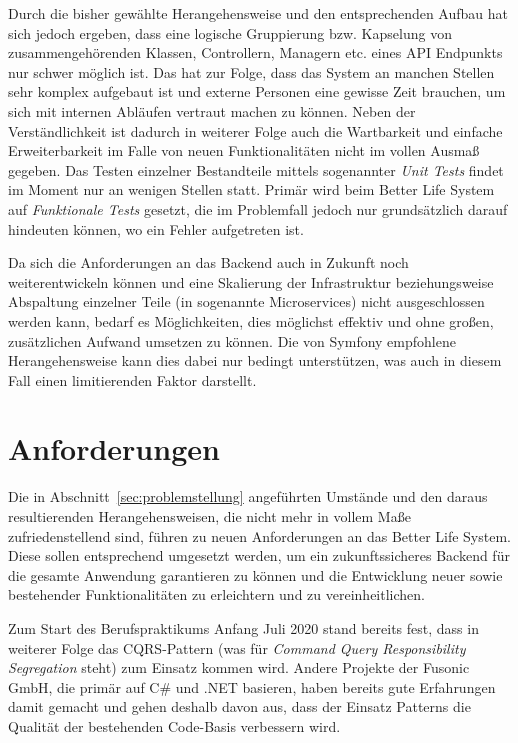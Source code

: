\documentclass[a4paper,12pt,twoside]{scrreprt}
\begin{document}
Durch die bisher gewählte Herangehensweise und den entsprechenden Aufbau hat sich jedoch ergeben, dass eine logische Gruppierung bzw. Kapselung von zusammengehörenden Klassen, Controllern, Managern etc. eines API Endpunkts nur schwer möglich ist. Das hat zur Folge, dass das System an manchen Stellen sehr komplex aufgebaut ist und externe Personen eine gewisse Zeit brauchen, um sich mit internen Abläufen vertraut machen zu können. Neben der Verständlichkeit ist dadurch in weiterer Folge auch die Wartbarkeit und einfache Erweiterbarkeit im Falle von neuen Funktionalitäten nicht im vollen Ausmaß gegeben. Das Testen einzelner Bestandteile mittels sogenannter \textit{Unit Tests} findet im Moment nur an wenigen Stellen statt. Primär wird beim Better Life System auf \textit{Funktionale Tests} gesetzt, die im Problemfall jedoch nur grundsätzlich darauf hindeuten können, wo ein Fehler aufgetreten ist.

Da sich die Anforderungen an das Backend auch in Zukunft noch weiterentwickeln können und eine Skalierung der Infrastruktur beziehungsweise Abspaltung einzelner Teile (in sogenannte Microservices) nicht ausgeschlossen werden kann, bedarf es Möglichkeiten, dies möglichst effektiv und ohne großen, zusätzlichen Aufwand umsetzen zu können. Die von Symfony empfohlene Herangehensweise kann dies dabei nur bedingt unterstützen, was auch in diesem Fall einen limitierenden Faktor darstellt.

\section{Anforderungen}
\label{sec:anforderungen}
Die in Abschnitt~\ref{sec:problemstellung} angeführten Umstände und den daraus resultierenden Herangehensweisen, die nicht mehr in vollem Maße zufriedenstellend sind, führen zu neuen Anforderungen an das Better Life System. Diese sollen entsprechend umgesetzt werden, um ein zukunftssicheres Backend für die gesamte Anwendung garantieren zu können und die Entwicklung neuer sowie bestehender Funktionalitäten zu erleichtern und zu vereinheitlichen.

\medskip

Zum Start des Berufspraktikums Anfang Juli 2020 stand bereits fest, dass in weiterer Folge das CQRS-Pattern (was für \textit{Command Query Responsibility Segregation} steht) zum Einsatz kommen wird. Andere Projekte der Fusonic GmbH, die primär auf C\# und .NET basieren, haben bereits gute Erfahrungen damit gemacht und gehen deshalb davon aus, dass der Einsatz Patterns die Qualität der bestehenden Code-Basis verbessern wird.
\end{document}
